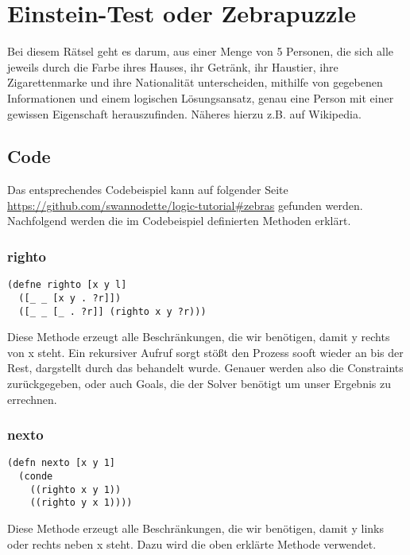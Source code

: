 \section{Einstein-Test oder Zebrapuzzle}

Bei diesem Rätsel geht es darum, aus einer Menge von 5 Personen, die sich alle jeweils durch die Farbe ihres Hauses, ihr Getränk, ihr Haustier, ihre Zigarettenmarke und ihre Nationalität unterscheiden, mithilfe von gegebenen Informationen und einem logischen Lösungsansatz, genau eine Person mit einer gewissen Eigenschaft herauszufinden. Näheres hierzu z.B. auf Wikipedia.

\subsection{Code}

Das entsprechendes Codebeispiel kann auf folgender Seite \url{https://github.com/swannodette/logic-tutorial#zebras} gefunden werden. 
Nachfolgend werden die im Codebeispiel definierten Methoden erklärt.

\subsubsection{righto}

\begin{lstlisting}
(defne righto [x y l]
  ([_ _ [x y . ?r]])
  ([_ _ [_ . ?r]] (righto x y ?r)))
\end{lstlisting}

Diese Methode erzeugt alle Beschränkungen, die wir benötigen, damit \dq{}y\dq{} rechts von \dq{}x\dq{} steht. Ein rekursiver Aufruf sorgt stößt den Prozess sooft wieder an bis der Rest, dargstellt durch das  behandelt wurde. Genauer werden also die Constraints zurückgegeben, oder auch Goals, die der Solver benötigt um unser Ergebnis zu errechnen.

\subsubsection{nexto}

\begin{lstlisting}
(defn nexto [x y 1]
  (conde
    ((righto x y 1))
    ((righto y x 1))))
\end{lstlisting}

Diese Methode erzeugt alle Beschränkungen, die wir benötigen, damit \dq{}y\dq{} links oder rechts neben \dq{}x\dq{} steht. Dazu wird die oben erklärte Methode  verwendet.
\\
